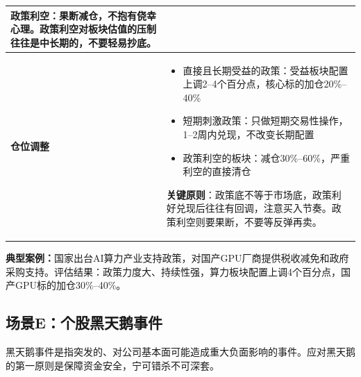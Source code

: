 \begin{exhibitbox}[表9-20：政策重大变化调仓指南]
\begin{tabularx}{\textwidth}{l X}
\textbf{政策利空}：果断减仓，不抱有侥幸心理。政策利空对板块估值的压制往往是中长期的，不要轻易抄底。
\\
\midrule
\textbf{仓位调整} & 
\begin{itemize}[leftmargin=1.2em]
\item 直接且长期受益的政策：受益板块配置上调2--4个百分点，核心标的加仓20\%--40\%
\item 短期刺激政策：只做短期交易性操作，1--2周内兑现，不改变长期配置
\item 政策利空的板块：减仓30\%--60\%，严重利空的直接清仓
\end{itemize}
\vspace{0.3em}
\textbf{关键原则}：政策底不等于市场底，政策利好兑现后往往有回调，注意买入节奏。政策利空则要果断，不要等反弹再卖。
\\
\bottomrule
\end{tabularx}
\vspace{0.2cm}

\textbf{典型案例：}国家出台AI算力产业支持政策，对国产GPU厂商提供税收减免和政府采购支持。评估结果：政策力度大、持续性强，算力板块配置上调4个百分点，国产GPU标的加仓30\%--40\%。
\end{exhibitbox}

\subsection{场景E：个股黑天鹅事件}

黑天鹅事件是指突发的、对公司基本面可能造成重大负面影响的事件。应对黑天鹅的第一原则是保障资金安全，宁可错杀不可深套。

